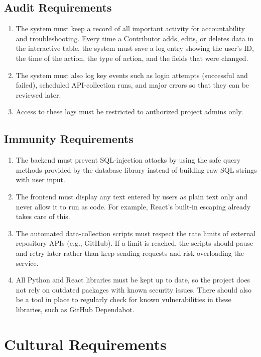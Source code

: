 \documentclass[12pt]{article}
\begin{document}
\subsection{Audit Requirements}
\begin{enumerate}[label=SR-AU\arabic*]
\item The system must keep a record of all important activity for accountability and troubleshooting. Every time a Contributor adds, edits, or deletes data in the interactive table, the system must save a log entry showing the user’s ID, the time of the action, the type of action, and the fields that were changed.
\item The system must also log key events such as login attempts (successful and failed), scheduled API-collection runs, and major errors so that they can be reviewed later.
\item Access to these logs must be restricted to authorized project admins only.
\end{enumerate}
\subsection{Immunity Requirements}
\begin{enumerate}[label=SR-IM\arabic*]
\item The backend must prevent SQL-injection attacks by using the safe query methods provided by the database library instead of building raw SQL strings with user input.
\item The frontend must display any text entered by users as plain text only and never allow it to run as code. For example, React’s built-in escaping already takes care of this.
\item The automated data-collection scripts must respect the rate limits of external repository APIs (e.g., GitHub). If a limit is reached, the scripts should pause and retry later rather than keep sending requests and risk overloading the service.
\item All Python and React libraries must be kept up to date, so the project does not rely on outdated packages with known security issues. There should also be a tool in place to regularly check for known vulnerabilities in these libraries, such as GitHub Dependabot.
\end{enumerate}

\section{Cultural Requirements}
\end{document}
